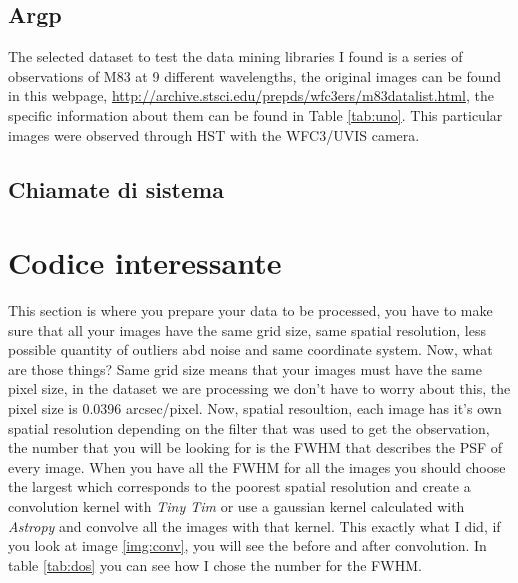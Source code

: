 \documentclass[11pt,fleqn]{book} %
\begin{document}
\subsection{Argp}
    The selected dataset to test the data mining libraries I found is a series of observations of M83 at 9 different wavelengths, the original images can be found in this webpage, \url{http://archive.stsci.edu/prepds/wfc3ers/m83datalist.html}, the specific information about them can be found in Table \ref{tab:uno}. This particular images were observed through HST with the WFC3/UVIS camera.

\subsection{Chiamate di sistema}

\section{Codice interessante}
This section is where you prepare your data to be processed, you have to make sure that all your images have the same grid size, same spatial resolution, less possible quantity of outliers abd noise and same coordinate system. Now, what are those things? Same grid size means that your images must have the same pixel size, in the dataset we are processing we don't have to worry about this, the pixel size is 0.0396 arcsec/pixel. Now, spatial resoultion, each image has it's own spatial resolution depending on the filter that was used to get the observation, the number that you will be looking for is the FWHM that describes the PSF of every image. When you have all the FWHM for all the images you should choose the largest which corresponds to the poorest spatial resolution and create a convolution kernel with \emph{Tiny Tim} or use a gaussian kernel calculated with \emph{Astropy} and convolve all the images with that kernel. This exactly what I did, if you look at image \ref{img:conv}, you will see the before and after convolution. In table \ref{tab:dos} you can see how I chose the number for the FWHM.
\end{document}
